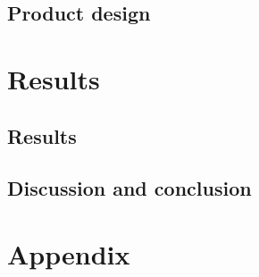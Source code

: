 \chapter{Product design}



\part{Results}\label{pt:test}
\chapter{Results}
\graphicspath{{figures/tests/}}
%
\chapter{Discussion and conclusion}
%



 




\glsresetall
\appendix %

 \graphicspath{{figures/appendix/}}
\part{Appendix}\label{pt:appendix}
%

%






